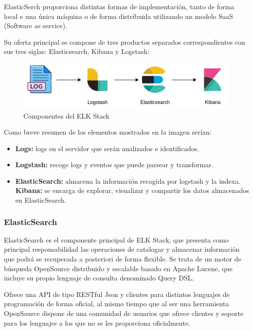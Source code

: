 ElasticSerch proporciona distintas formas de implementación, tanto de forma local e una única máquina o de forma distribuida utilizando un modelo SaaS (Software as service).

Su oferta principal se compone de tres productos separados correspondientes con sus tres siglas: Elasticsearch, Kibana y Logstash:

\begin{figure}[H]
\centerline{\includegraphics[width=15cm]{figuras/elkstack.png}}
\caption{Componentes del ELK Stack}
\label{enlace1}
\end{figure}

Como breve resumen de los elementos mostrados en la imagen serían:
\begin{itemize}
\item \textbf{Logs:} logs en el servidor que serán analizados e identificados.
\item \textbf{Logstash:} recoge logs y eventos que puede parsear y transformar.
\item \textbf{ElasticSearch:} almacena la información recogida por logstash y la indexa.
\itemn \textbf{Kibana:} se encarga de explorar, visualizar y compartir los datos almacenados en ElasticSearch.
\end{itemize}

\subsubsection{ElasticSearch}

ElasticSearch es el componente principal de ELK Stack, que presenta como principal responsabilidad las operaciones de catalogar y almacenar información que podrá se recuperada a posteriori de forma flexible. Se trata de un motor de búsqueda OpenSource distribuido y escalable basado en Apache Lucene, que incluye su propio lenguaje de consulta denominado Query DSL. 

Ofrece una API de tipo RESTful Json y clientes para distintos lenguajes de programación de forma oficial, al mismo tiempo que al ser una herramienta OpenSource dispone de una comunidad de usuarios que ofrece clientes y soporte para los lenguajes a los que no se les proporciona oficialmente.

